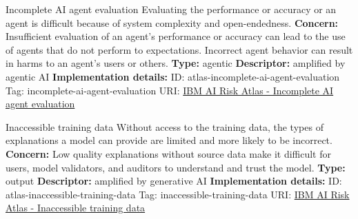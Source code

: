 \begin{definitionbox}{Incomplete AI agent evaluation}
Evaluating the performance or accuracy or an agent is difficult because of system complexity and open-endedness.\newline\newline
\textbf{Concern: }Insufficient evaluation of an agent's performance or accuracy can lead to the use of agents that do not perform to expectations. Incorrect agent behavior can result in harms to an agent's users or others.\newline\newline
\textbf{Type: }agentic\newline
\textbf{Descriptor: }amplified by agentic AI \newline\newline
\textbf{Implementation details: } \newline
ID: atlas-incomplete-ai-agent-evaluation \newline
Tag: incomplete-ai-agent-evaluation \newline
URI:  \href{https://www.ibm.com/docs/en/watsonx/saas?topic=SSYOK8/wsj/ai-risk-atlas/incomplete-ai-agent-evaluation.html}{IBM AI Risk Atlas - Incomplete AI agent evaluation}\newline
\end{definitionbox}
\begin{definitionbox}{Inaccessible training data}
Without access to the training data, the types of explanations a model can provide are limited and more likely to be incorrect.\newline\newline
\textbf{Concern: }Low quality explanations without source data make it difficult for users, model validators, and auditors to understand and trust the model.\newline\newline
\textbf{Type: }output\newline
\textbf{Descriptor: }amplified by generative AI \newline\newline
\textbf{Implementation details: } \newline
ID: atlas-inaccessible-training-data \newline
Tag: inaccessible-training-data \newline
URI:  \href{https://www.ibm.com/docs/en/watsonx/saas?topic=SSYOK8/wsj/ai-risk-atlas/inaccessible-training-data.html}{IBM AI Risk Atlas - Inaccessible training data}\newline
\end{definitionbox}
